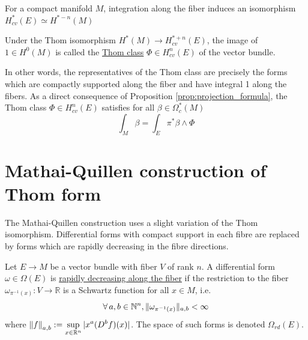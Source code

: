 \begin{thm} %
	For a compact manifold $M$,
	integration along the fiber induces an isomorphism
	 $H^*_{cv}(E) \simeq H^{*-n}(M)$
\end{thm}
\begin{defn}
	Under the Thom isomorphism $H^*(M)\to H_{cv}^{*+n}(E)$, the
	image of $1\in H^0(M)$ is called the \underline{Thom class}  $\Phi\in
	H_{cv}^n(E)$ of the vector bundle.
\end{defn}
In other words, the representatives of the Thom class are precisely the forms
which are compactly supported along the fiber and have integral 1 along the
fibers. As a direct consequence of Proposition \ref{prop:projection_formula},
the Thom class $\Phi \in H_{cv}^n(E)$ satisfies for all $\beta \in \Omega^*_c(M)$
\begin{equation} \label{eq:thom_form_property}
	\int_M \beta = \int_E \pi^*\beta \wedge \Phi
\end{equation}


\section{Mathai-Quillen construction of Thom form}
\label{section:mq_formula}
The Mathai-Quillen construction uses a slight variation of the Thom isomorphism.
Differential forms with compact support in each fibre are replaced by forms
which are rapidly decreasing in the fibre directions. 

\begin{defn}
	Let $E\to M$ be a vector bundle with fiber  $V$ of rank  $n$.
	A differential form $\omega\in \Omega(E)$ is \underline{rapidly decreasing
	along the fiber} if the restriction to the fiber 
	$\omega_{\pi^{-1}(x)} : V \to \mathbb{R}$ is a Schwartz function for all $x\in M$,
	i.e.
	 \[
		 \fall a,b \in \mathbb{N}^n, \norm[*]{\omega_{\pi^{-1}(x)}}_{a,b} < \infty
	\] 
	where $\displaystyle \norm{f}_{a,b} := \sup_{x\in \mathbb{R}^n}\abs[*]{x^a(D^bf)(x)}$.
	The space of such forms is denoted $\Omega_{rd}(E)$.
\end{defn}

\vspace{-1ex}

